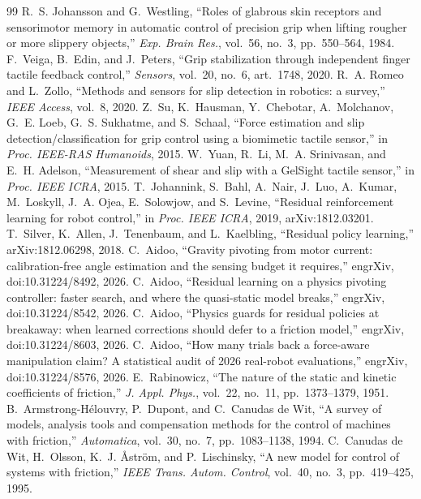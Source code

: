 \begin{thebibliography}{99}\setlength{\itemsep}{1pt}
 R.~S. Johansson and G.~Westling, ``Roles of glabrous skin receptors and sensorimotor memory in automatic control of precision grip when lifting rougher or more slippery objects,'' \emph{Exp. Brain Res.}, vol.~56, no.~3, pp.~550--564, 1984.
 F.~Veiga, B.~Edin, and J.~Peters, ``Grip stabilization through independent finger tactile feedback control,'' \emph{Sensors}, vol.~20, no.~6, art.~1748, 2020.
 R.~A. Romeo and L.~Zollo, ``Methods and sensors for slip detection in robotics: a survey,'' \emph{IEEE Access}, vol.~8, 2020.
 Z.~Su, K.~Hausman, Y.~Chebotar, A.~Molchanov, G.~E. Loeb, G.~S. Sukhatme, and S.~Schaal, ``Force estimation and slip detection/classification for grip control using a biomimetic tactile sensor,'' in \emph{Proc. IEEE-RAS Humanoids}, 2015.
 W.~Yuan, R.~Li, M.~A. Srinivasan, and E.~H. Adelson, ``Measurement of shear and slip with a GelSight tactile sensor,'' in \emph{Proc. IEEE ICRA}, 2015.
 T.~Johannink, S.~Bahl, A.~Nair, J.~Luo, A.~Kumar, M.~Loskyll, J.~A. Ojea, E.~Solowjow, and S.~Levine, ``Residual reinforcement learning for robot control,'' in \emph{Proc. IEEE ICRA}, 2019, arXiv:1812.03201.
 T.~Silver, K.~Allen, J.~Tenenbaum, and L.~Kaelbling, ``Residual policy learning,'' arXiv:1812.06298, 2018.
 C.~Aidoo, ``Gravity pivoting from motor current: calibration-free angle estimation and the sensing budget it requires,'' engrXiv, doi:10.31224/8492, 2026.
 C.~Aidoo, ``Residual learning on a physics pivoting controller: faster search, and where the quasi-static model breaks,'' engrXiv, doi:10.31224/8542, 2026.
 C.~Aidoo, ``Physics guards for residual policies at breakaway: when learned corrections should defer to a friction model,'' engrXiv, doi:10.31224/8603, 2026.
 C.~Aidoo, ``How many trials back a force-aware manipulation claim? A statistical audit of 2026 real-robot evaluations,'' engrXiv, doi:10.31224/8576, 2026.
 E.~Rabinowicz, ``The nature of the static and kinetic coefficients of friction,'' \emph{J. Appl. Phys.}, vol.~22, no.~11, pp.~1373--1379, 1951.
 B.~Armstrong-H{\'e}louvry, P.~Dupont, and C.~Canudas de Wit, ``A survey of models, analysis tools and compensation methods for the control of machines with friction,'' \emph{Automatica}, vol.~30, no.~7, pp.~1083--1138, 1994.
 C.~Canudas de Wit, H.~Olsson, K.~J. {\AA}str{\"o}m, and P.~Lischinsky, ``A new model for control of systems with friction,'' \emph{IEEE Trans. Autom. Control}, vol.~40, no.~3, pp.~419--425, 1995.

\end{thebibliography}
